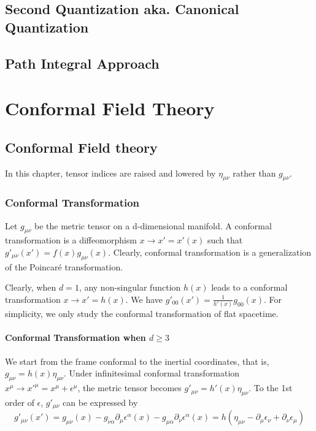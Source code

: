 \documentclass[12pt]{book}
\begin{document}
\chapter{Second Quantization aka. Canonical Quantization}

\chapter{Path Integral Approach}
	
\part{Conformal Field Theory}

	\chapter{Conformal Field theory}
	
	In this chapter, tensor indices are raised and lowered by $\eta_{\mu\nu}$ rather than $g_{\mu\nu}$.
	
	\section{Conformal Transformation}
	
	Let $g_{\mu\nu}$ be the metric tensor on a d-dimensional manifold. A conformal transformation is a diffeomorphism $x\rightarrow x'=x'(x)$ such that $g'_{\mu\nu}(x')=f(x)g_{\mu\nu}(x)$. Clearly, conformal transformation is a generalization of the Poincar\'e transformation.
	
	Clearly, when $d=1$, any non-singular function $h(x)$ leads to a conformal transformation $x\rightarrow x'=h(x)$. We have $g'_{00}(x')=\frac 1 {h'(x)}g_{00}(x)$. For simplicity, we only study the conformal transformation of flat spacetime.
	\subsection{Conformal Transformation when $d\geq3$}
	We start from the frame conformal to the inertial coordinates, that is, $g_{\mu\nu}=h(x)\eta_{\mu\nu}$. Under infinitesimal conformal transformation $x^\mu\rightarrow x'^\mu=x^\mu+\epsilon^\mu$, the metric tensor becomes $g'_{\mu\nu}=h'(x)\eta_{\mu\nu}$. To the 1st order of $\epsilon$, $g'_{\mu\nu}$ can be expressed by
	\begin{equation}
		g'_{\mu\nu}(x')=g_{\mu\nu}(x)-g_{\nu\alpha}\partial_\mu\epsilon^\alpha(x)-g_{\mu\alpha}\partial_\nu\epsilon^\alpha(x)=h(\eta_{\mu\nu}-\partial_\mu\epsilon_\nu+\partial_\nu\epsilon_\mu)
	\end{equation}
	
\end{document}
